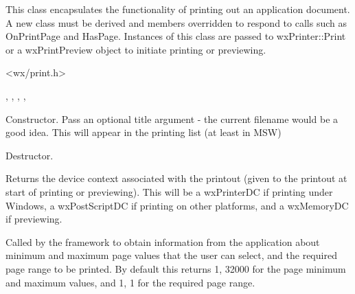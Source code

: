 This class encapsulates the functionality of printing out an
application document. A new class must be derived and members
overridden to respond to calls such as OnPrintPage and HasPage.
Instances of this class are passed to wxPrinter::Print or a
wxPrintPreview object to initiate printing or previewing.




<wx/print.h>


, , ,\rtfsp
{}, 




Constructor. Pass an optional title argument - the current filename would be a good idea. This will appear in the printing list
(at least in MSW)



Destructor.

\label{wxprintoutgetdc}


Returns the device context associated with the printout (given to the printout at start of
printing or previewing). This will be a wxPrinterDC if printing under Windows,
a wxPostScriptDC if printing on other platforms, and a wxMemoryDC if previewing.

\label{wxprintoutgetpageinfo}


Called by the framework to obtain information from the application about minimum and maximum page values that
the user can select, and the required page range to be printed. By default this
returns 1, 32000 for the page minimum and maximum values, and 1, 1 for the required page range.

